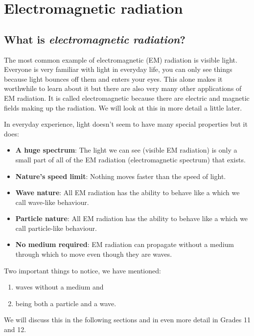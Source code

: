 \chapter[Electromagnetic radiation]{Electromagnetic \mbox{ra\-di\-a\-tion}}
    \setcounter{figure}{1}
    \setcounter{subfigure}{1}
    \label{459e2bef85baf867f5850bc8338cad3a}
         \section{What is \textsl{electromagnetic radiation}?}
    
  The most common example of electromagnetic (EM) radiation is visible light. Everyone is very familiar with light in everyday life, you can only see things because light bounces off them and enters your eyes. This alone makes it worthwhile to learn about it but there are also very many other applications of EM radiation. It is called electromagnetic because there are electric and magnetic fields making up the radiation. We will look at this in more detail a little later.

  In everyday experience, light doesn't seem to have many special properties but it does:
\begin{itemize}
 \item \textbf{A huge spectrum}: The light we can see (visible EM radiation) is only a small part of all of the EM radiation (electromagnetic spectrum) that exists.
 \item \textbf{Nature's speed limit}: Nothing moves faster than the speed of light. 
 \item \textbf{Wave nature}: All EM radiation has the ability to behave like a  which we call wave-like behaviour.
 \item \textbf{Particle nature}: All EM radiation has the ability to behave like a  which we call particle-like behaviour.
 \item \textbf{No medium required}: EM radiation can propagate without a medium through which to move even though they are waves.
\end{itemize}

Two important things to notice, we have mentioned:
\begin{enumerate}[noitemsep, label=\textbf{\arabic*}. ]
 \item waves without a medium and
 \item being both a particle and a wave.
\end{enumerate}
We will discuss this in the following sections and in even more detail in Grades 11 and 12.

